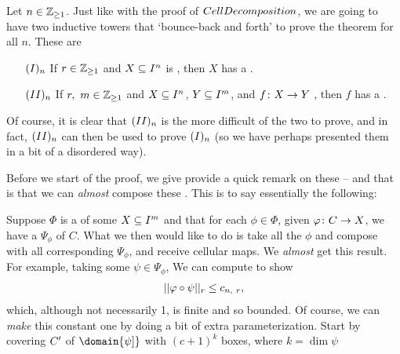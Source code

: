 \begin{theorem}
  Let $n \in \Zgeq{1}$. Just like with the proof of $\CD$, we are going to have two inductive towers that `bounce-back and forth' to prove the theorem for all $n$. These are
    \begin{enumerate}[label={}]
    \item[$\In$ ] If $r \in \Zgeq{1}$ and $\CIn[X]{n}$ is , then $X$ has a \cellrparam.
    \item[$\IIn$ ] If $r, \ m \in \Zgeq{1}$ and $\CIn[X]{n}$, $\CIn[Y]{m}$, and $\funcdom{f}{X}{Y}$ , then $f$ has a \cellrparam.
  \end{enumerate}
  Of course, it is clear that $\IIn$ is the more difficult of the two to prove, and in fact, $\IIn$ can then be used to prove $\In$ (so we have perhaps presented them in a bit of a disordered way).
  \label{thm:existence}
\end{theorem}

Before we start of the proof, we give provide a quick remark on these \cellrparams -- and that is that we can \emph{almost} compose these \cellrparams. This is to say essentially the following:

\begin{remark}
  Suppose $\Phi$ is a \cellrparam of some $\CIn[X]{m}$ and that for each $\phi \in \Phi$, given $\funcdom{\phi}{C}{X}$, we have a \cellrparam $\Psi_{\phi}$ of $C$. What we then would like to do is take all the $\phi$ and compose with all corresponding $\Psi_{\phi}$, and receive cellular maps. We \emph{almost} get this result. For example, taking some $\psi \in \Psi_{\phi}$, We can compute to show
    \begin{align*}
      \rnorm[r]{\phi \circ \psi} \leq c_{n, \ r},
    \end{align*}
    which, although not necessarily 1, is finite and so bounded. Of course, we can \emph{make} this constant one by doing a bit of extra parameterization. Start by covering $\pri{C}$ of $\domain{\psi]}$ with $(c + 1)^k$ boxes, where $k = \dim{\psi}$

\end{remark}
